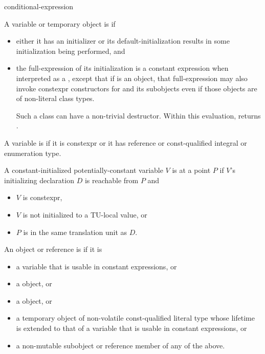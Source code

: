 \begin{bnf}
\br
    conditional-expression
\end{bnf}

\pnum
A variable or temporary object  is  if
\begin{itemize}
\item
  either it has an initializer or
  its default-initialization results in some initialization being performed, and
\item
  the full-expression of its initialization is a constant expression
  when interpreted as a ,
  except that if  is an object,
  that full-expression
  may also invoke constexpr constructors
  for  and its subobjects
  even if those objects are of non-literal class types.
  \begin{note}
  Such a class can have a non-trivial destructor.
  Within this evaluation,
  returns .
\end{note}
\end{itemize}

\pnum
A variable is  if
it is constexpr or
it has reference or const-qualified integral or enumeration type.

\pnum
A constant-initialized potentially-constant variable $V$ is
 at a point $P$ if
$V$'s initializing declaration $D$ is reachable from $P$ and
\begin{itemize}
\item $V$ is constexpr,
\item $V$ is not initialized to a TU-local value, or
\item $P$ is in the same translation unit as $D$.
\end{itemize}
An object or reference is  if it is
\begin{itemize}
\item a variable that is usable in constant expressions, or
\item a  object, or
\item a  object, or
\item a temporary object of non-volatile const-qualified literal type
  whose lifetime is extended
  to that of a variable that is usable in constant expressions, or
\item a non-mutable subobject or reference member of any of the above.
\end{itemize}

